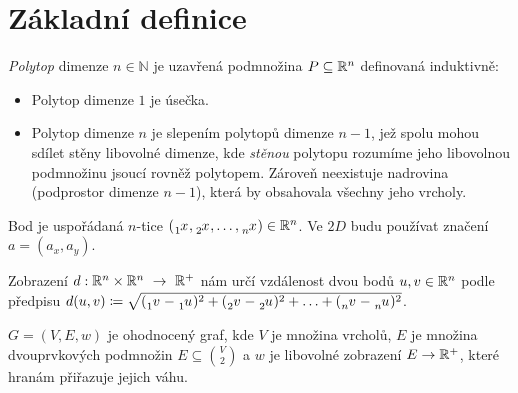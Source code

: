 \chapter*{Základní definice}
\label{sec:zakladni-pojmy}

\begin{definition}[Polytop]
  \emph{Polytop} dimenze $n \in \mathbb{N}$ je uzavřená podmnožina $P \subseteq \mathbb{R}^{n}$ definovaná induktivně:
  \begin{itemize}
    \item Polytop dimenze $1$ je úsečka.
    \item Polytop dimenze $n$ je slepením polytopů dimenze $n-1$, jež spolu mohou
          sdílet stěny libovolné dimenze, kde \emph{stěnou} polytopu rozumíme jeho
          libovolnou podmnožinu jsoucí rovněž polytopem.
          Zároveň neexistuje nadrovina (podprostor dimenze $n - 1$), která by obsahovala všechny jeho vrcholy.
          \autocite{adamklepacDefinicePolytopu2024}
  \end{itemize}

\end{definition}

\begin{definition}[Bod]
  \label{definice:bod}
  Bod je uspořádaná $n$-tice $(\xx{1}, \xx{2}, \ldots, \xx{n}) \in \R^n$. Ve $2D$ budu používat značení $a=(a_x, a_y)$.
\end{definition}

\begin{definition}[Vzdálenost]
  \label{definice:vzdalenost}
  Zobrazení $d: \mathbb{R}^n\times \mathbb{R}^n~\rightarrow~\mathbb{R}^+$ nám určí vzdálenost dvou bodů $u, v \in \mathbb{R}^n$
  podle předpisu $d(u, v) \coloneqq \sqrt{(\vvv{1}-\uu{1})^2+(\vvv{2}-\uu{2})^2+\ldots+(\vvv{n}-\uu{n})^2}$.
\end{definition}

\begin{definition}
  \label{definice:ohodnoceny_graf}
  $G = (V, E, w)$ je ohodnocený graf, kde $V$ je množina vrcholů, $E$ je množina dvouprvkových podmnožin $E \subseteq \binom{V}{2}$ a $w$ je libovolné zobrazení $E \rightarrow \mathbb{R}^+$, které hranám přiřazuje jejich váhu.
\end{definition}

